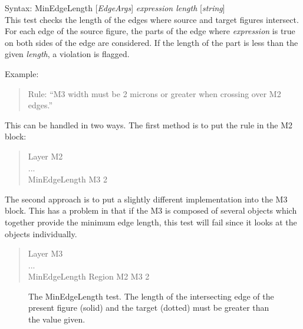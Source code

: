\begin{description}
\item{Syntax: {\vt MinEdgeLength} [{\it EdgeArgs\/}]
    {\it expression length} [{\it string\/}] }\\

This test checks the length of the edges where source and target
figures intersect.  For each edge of the source figure, the parts of
the edge where {\it expression} is true on both sides of the edge are
considered.  If the length of the part is less than the given {\it
length}, a violation is flagged.

Example:
\begin{quote}
Rule: ``M3 width must be 2 microns or greater when crossing over M2 edges.''
\end{quote}

This can be handled in two ways.  The first method is to put the rule
in the M2 block:

\vspace*{.5cm}

\begin{quote}\rr\vt
    Layer M2\\
    ...\\
    MinEdgeLength M3 2\\
\end{quote}

The second approach is to put a slightly different implementation into
the M3 block.  This has a problem in that if the M3 is composed of
several objects which together provide the minimum edge length, this
test will fail since it looks at the objects individually.

\begin{quote}\rr\vt
    Layer M3\\
    ...\\
    MinEdgeLength Region M2 M3 2\\
\end{quote}
\end{description}

\begin{figure}
\caption{\label{drcminedgelength} The {\et MinEdgeLength} test.  The
length of the intersecting edge of the present figure (solid) and the
target (dotted) must be greater than the value given.}
\vspace{1.5ex}
\begin{center}
\end{center}
\end{figure}

